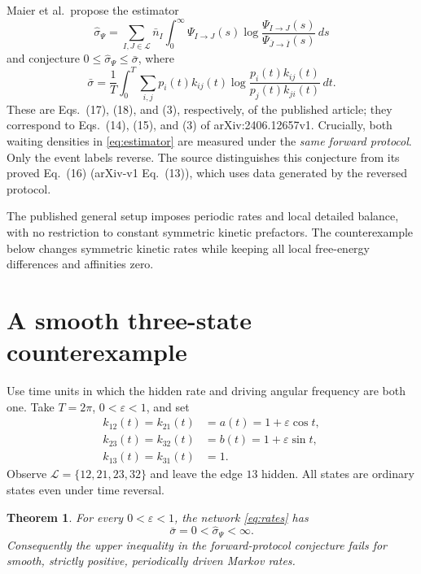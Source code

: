 \documentclass[11pt]{amsart}
\newtheorem{theorem}{Theorem}
\newcommand{\rev}[1]{\overline{#1}}
\begin{document}
Maier et al.\ propose the estimator \cite{maier2024}
\begin{equation}\label{eq:estimator}
 \widehat\sigma_\Psi=
 \sum_{I,J\in\mathcal L}\bar n_I\int_0^\infty
 \Psi_{I\to J}(s)
 \log\frac{\Psi_{I\to J}(s)}{\Psi_{\rev J\to\rev I}(s)}\,ds
\end{equation}
and conjecture $0\leq\widehat\sigma_\Psi\leq\bar\sigma$, where
\begin{equation}\label{eq:ep}
 \bar\sigma=\frac1T\int_0^T\sum_{i,j}
 p_i(t)k_{ij}(t)\log\frac{p_i(t)k_{ij}(t)}{p_j(t)k_{ji}(t)}\,dt.
\end{equation}
These are Eqs.\ (17), (18), and (3), respectively, of the published article;
they correspond to Eqs.\ (14), (15), and (3) of arXiv:2406.12657v1.
Crucially, both waiting densities in \eqref{eq:estimator} are measured
under the \emph{same forward protocol}. Only the event labels reverse.
The source distinguishes this conjecture from its proved Eq.\ (16)
(arXiv-v1 Eq.\ (13)), which uses data generated by the reversed protocol.

The published general setup imposes periodic rates and local detailed
balance, with no restriction to constant symmetric kinetic prefactors.
The counterexample below changes symmetric kinetic rates while keeping
all local free-energy differences and affinities zero.

\section{A smooth three-state counterexample}
Use time units in which the hidden rate and driving angular frequency
are both one. Take $T=2\pi$, $0<\varepsilon<1$, and set
\begin{align}\label{eq:rates}
 k_{12}(t)=k_{21}(t)&=a(t)=1+\varepsilon\cos t,\nonumber\\
 k_{23}(t)=k_{32}(t)&=b(t)=1+\varepsilon\sin t,\\
 k_{13}(t)=k_{31}(t)&=1.\nonumber
\end{align}
Observe $\mathcal L=\{12,21,23,32\}$ and leave the edge $13$ hidden.
All states are ordinary states even under time reversal.

\begin{theorem}\label{thm:counterexample}
For every $0<\varepsilon<1$, the network \eqref{eq:rates} has
\[
 \bar\sigma=0<\widehat\sigma_\Psi<\infty.
\]
Consequently the upper inequality in the forward-protocol conjecture
fails for smooth, strictly positive, periodically driven Markov rates.
\end{theorem}
\end{document}
